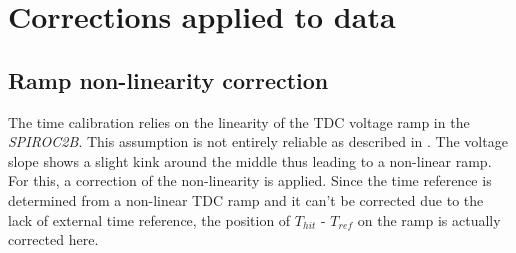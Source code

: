 \section{Corrections applied to data}

\subsection{Ramp non-linearity correction}
\label{subsec:lin_corr}

The time calibration relies on the linearity of the TDC voltage ramp in the \textit{SPIROC2B}. This assumption is not entirely reliable as described in \cite{Hartbrich2011, Brianne2012}. The voltage slope shows a slight kink around the middle thus leading to a non-linear ramp. For this, a correction of the non-linearity is applied. Since the time reference is determined from a non-linear TDC ramp and it can't be corrected due to the lack of external time reference, the position of $T_{hit}$ - $T_{ref}$ on the ramp is actually corrected here.

